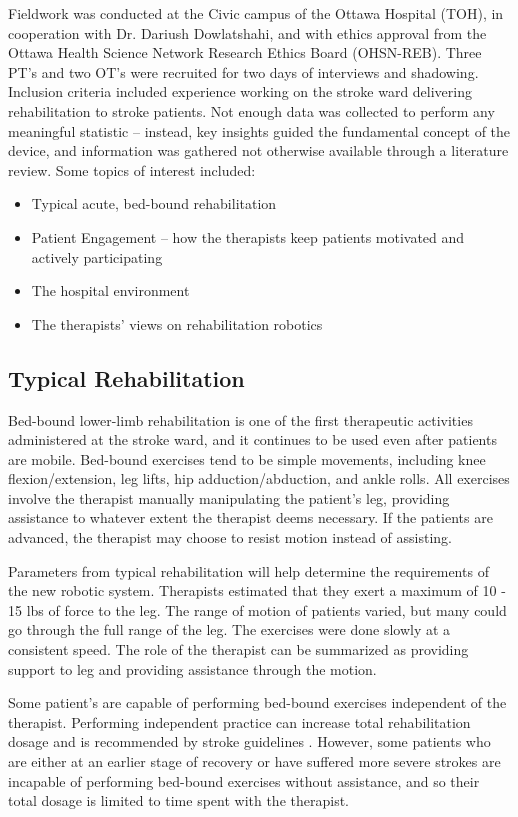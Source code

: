 \documentclass[12pt]{report}
\begin{document}
	Fieldwork was conducted at the Civic campus of the Ottawa Hospital (TOH), in cooperation with Dr. Dariush Dowlatshahi, and with ethics approval from the Ottawa Health Science Network Research Ethics Board (OHSN-REB). Three PT's and two OT's were recruited for two days of interviews and shadowing. Inclusion criteria included experience working on the stroke ward delivering rehabilitation to stroke patients. Not enough data was collected to perform any meaningful statistic -- instead, key insights guided the fundamental concept of the device, and information was gathered not otherwise available through a literature review. Some topics of interest included:
	
	\begin{itemize}
		\item Typical acute, bed-bound rehabilitation 
		\item Patient Engagement -- how the therapists keep patients motivated and actively participating 
		\item The hospital environment
		\item The therapists' views on rehabilitation robotics 
	\end{itemize}

	
	\subsection{Typical Rehabilitation}
	
	Bed-bound lower-limb rehabilitation is one of the first therapeutic activities administered at the stroke ward, and it continues to be used even after patients are mobile. Bed-bound exercises tend to be simple movements, including knee flexion/extension, leg lifts, hip adduction/abduction, and ankle rolls. All exercises involve the therapist manually manipulating the patient's leg, providing assistance to whatever extent the therapist deems necessary. If the patients are advanced, the therapist may choose to resist motion instead of assisting. 
	
	Parameters from typical rehabilitation will help determine the requirements of the new robotic system. Therapists estimated that they exert a maximum of 10 - 15 lbs of force to the leg. The range of motion of patients varied, but many could go through the full range of the leg. The exercises were done slowly at a consistent speed. The role of the therapist can be summarized as providing support to leg and providing assistance through the motion. 
	
	Some patient's are capable of performing bed-bound exercises independent of the therapist. Performing independent practice can increase total rehabilitation dosage and is recommended by stroke guidelines \cite{Hebert2016}. However, some patients who are either at an earlier stage of recovery or have suffered more severe strokes are incapable of performing bed-bound exercises without assistance, and so their total dosage is limited to time spent with the therapist. 
	
\end{document}
